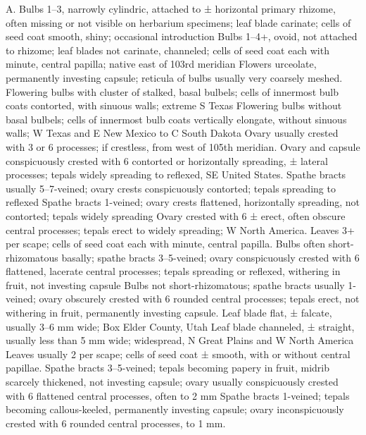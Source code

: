 \documentclass[a4paper]{article}
\begin{document}
\begin{Key}{A. }
\alter Bulbs 1--3, narrowly cylindric, attached to ± horizontal primary rhizome, often missing or not visible on herbarium specimens; leaf blade carinate; cells of seed coat smooth, shiny; occasional introduction
\alter Bulbs 1--4+, ovoid, not attached to rhizome; leaf blades not carinate, channeled; cells of seed coat each with minute, central papilla; native east of 103rd meridian
\alter Flowers urceolate, permanently investing capsule; reticula of bulbs usually very coarsely meshed.
\alter Flowering bulbs with cluster of stalked, basal bulbels; cells of innermost bulb coats contorted, with sinuous walls; extreme S Texas
\alter Flowering bulbs without basal bulbels; cells of innermost bulb coats vertically elongate, without sinuous walls; W Texas and E New Mexico to C South Dakota
\alter Ovary usually crested with 3 or 6 processes; if crestless, from west of 105th meridian.
\alter Ovary and capsule conspicuously crested with 6 contorted or horizontally spreading, ± lateral processes; tepals widely spreading to reflexed, SE United States.
\alter Spathe bracts usually 5--7-veined; ovary crests conspicuously contorted; tepals spreading to reflexed
\alter Spathe bracts 1-veined; ovary crests flattened, horizontally spreading, not contorted; tepals widely spreading
\alter Ovary crested with 6 ± erect, often obscure central processes; tepals erect to widely spreading; W North America.
\alter Leaves 3+ per scape; cells of seed coat each with minute, central papilla.
\alter Bulbs often short-rhizomatous basally; spathe bracts 3--5-veined; ovary conspicuously crested with 6 flattened, lacerate central processes; tepals spreading or reflexed, withering in fruit, not investing capsule
\alter Bulbs not short-rhizomatous; spathe bracts usually 1-veined; ovary obscurely crested with 6 rounded central processes; tepals erect, not withering in fruit, permanently investing capsule.
\alter Leaf blade flat, ± falcate, usually 3--6 mm wide; Box Elder County, Utah
\alter Leaf blade channeled, ± straight, usually less than 5 mm wide; widespread, N Great Plains and W North America
\alter Leaves usually 2 per scape; cells of seed coat ± smooth, with or without central papillae.
\alter Spathe bracts 3--5-veined; tepals becoming papery in fruit, midrib scarcely thickened, not investing capsule; ovary usually conspicuously crested with 6 flattened central processes, often to 2 mm
\alter Spathe bracts 1-veined; tepals becoming callous-keeled, permanently investing capsule; ovary inconspicuously crested with 6 rounded central processes, to 1 mm.

\end{Key}
\end{document}
